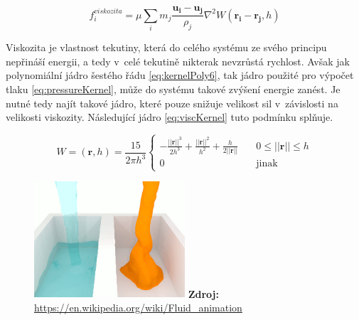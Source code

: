 \begin{equation}
	f^{viskozita}_i = \mu \sum_i m_j \frac{\mathbf{u_i} - \mathbf{u_j}}{\rho_j} \nabla^2 W(\mathbf{r_i} - \mathbf{r_j},h)
	\label{eq:ViscForce}
\end{equation}

Viskozita je vlastnost tekutiny, která do celého systému ze svého principu nepřináší energii, a tedy v~celé tekutině nikterak nevzrůstá rychlost. Avšak jak polynomiální jádro šestého řádu \ref{eq:kernelPoly6}, tak jádro použité pro výpočet tlaku \ref{eq:pressureKernel}, může do systému takové zvýšení energie zanést. Je nutné tedy najít takové jádro, které pouze snižuje velikost sil v~závislosti na velikosti viskozity. Následující jádro \ref{eq:viscKernel} tuto podmínku splňuje. \cite{Muller03}

\begin{equation}
	W = (\mathbf{r}, h) = \frac{15}{2 \pi h^3}
	\begin{cases}
		-\frac{||\mathbf{r}||^3}{2h^3} + \frac{||\mathbf{r}||^2}{h^2} + \frac{h}{2||\mathbf{r}||} & \quad 0 \leq ||\mathbf{r}|| \leq h \\
		0                                                                                         & \quad \text{jinak}
	\end{cases}
	\label{eq:viscKernel}
\end{equation}

\begin{figure}[hbt]
	\centering
	\captionsetup{justification=centering}
	\includegraphics[width=0.5\textwidth]{obrazky-figures/viskozita.PNG}
	\textbf{Zdroj: } \url{https://en.wikipedia.org/wiki/Fluid_animation}
	\label{fig:Vics}
\end{figure}

